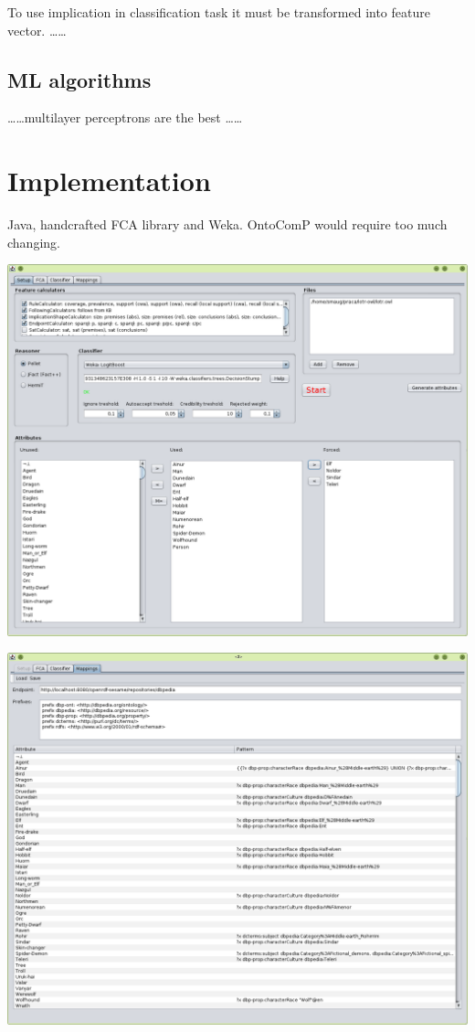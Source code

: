 \documentclass{llncs}
\begin{document}
To use implication in classification task it must be transformed into feature vector. \ldots\ldots

\subsection{ML algorithms}

\ldots\ldots multilayer perceptrons are the best \ldots\ldots

\section{Implementation}

Java, handcrafted FCA library and Weka. OntoComP would require too much changing.

\includegraphics[width=\textwidth]{screenshots/setup.png}

\includegraphics[width=\textwidth]{screenshots/mappings.png}
\end{document}
